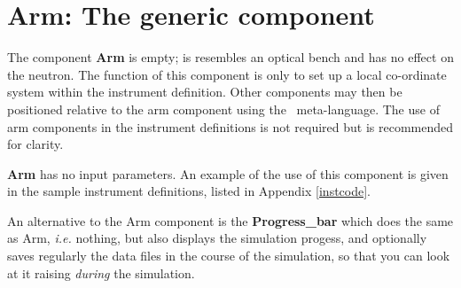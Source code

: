 \section{Arm: The generic component}
\label{explain:arm}

The component {\bf Arm} is empty; is resembles an optical bench
and has no effect on the neutron.
The function of this component is only to set up a local
co-ordinate system within the instrument definition.
Other components may then be
positioned relative to the arm component
using the \MCS\ meta-language.
The use of arm components in the instrument definitions
is not required but is recommended for clarity.

{\bf Arm} has no input parameters.
An example of the use of this component is given in the
sample instrument definitions, listed in Appendix \ref{instcode}.

An alternative to the Arm component is the {\bf Progress\_bar} which does the same as Arm, {\it i.e.} nothing, but also displays the simulation progess, and optionally saves regularly the data files in the course of the simulation, so that you can look at it raising \emph{during} the simulation.

